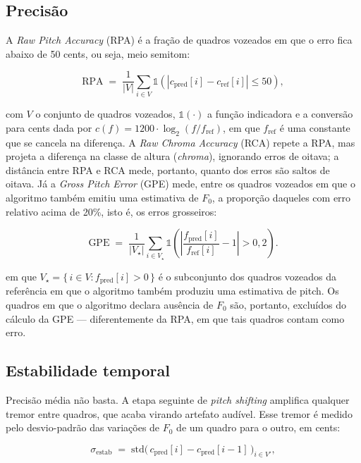 \subsection{Precisão}
A \textit{Raw Pitch Accuracy} (RPA) é a fração de quadros vozeados em que o erro fica abaixo de 50 cents, ou seja, meio semitom:

\begin{equation}
\label{eq:rpa}
\text{RPA} \;=\; \frac{1}{|V|} \sum_{i \in V}
\mathbb{1}\!\left( \left| c_{\text{pred}}[i] - c_{\text{ref}}[i] \right| \leq 50 \right),
\end{equation}

\noindent com $V$ o conjunto de quadros vozeados, $\mathbb{1}(\cdot)$ a função indicadora e a conversão para cents dada por $c(f) = 1200 \cdot \log_{2}(f / f_{\text{ref}})$, em que $f_{\text{ref}}$ é uma constante que se cancela na diferença. A \textit{Raw Chroma Accuracy} (RCA) repete a RPA, mas projeta a diferença na classe de altura (\textit{chroma}), ignorando erros de oitava; a distância entre RPA e RCA mede, portanto, quanto dos erros são saltos de oitava. Já a \textit{Gross Pitch Error} (GPE) mede, entre os quadros vozeados em que o algoritmo também emitiu uma estimativa de $F_0$, a proporção daqueles com erro relativo acima de 20\%, isto é, os erros grosseiros:

\begin{equation}
\label{eq:gpe}
\text{GPE} \;=\; \frac{1}{|V_{\star}|} \sum_{i \in V_{\star}}
\mathbb{1}\!\left(
\left| \frac{f_{\text{pred}}[i]}{f_{\text{ref}}[i]} - 1 \right| > 0{,}2
\right).
\end{equation}

\noindent em que $V_{\star} = \{\, i \in V : f_{\text{pred}}[i] > 0 \,\}$ é o subconjunto dos quadros vozeados da referência em que o algoritmo também produziu uma estimativa de pitch. Os quadros em que o algoritmo declara ausência de $F_0$ são, portanto, excluídos do cálculo da GPE --- diferentemente da RPA, em que tais quadros contam como erro.

\subsection{Estabilidade temporal}
Precisão média não basta. A etapa seguinte de \textit{pitch shifting} amplifica qualquer tremor entre quadros, que acaba virando artefato audível. Esse tremor é medido pelo desvio-padrão das variações de $F_0$ de um quadro para o outro, em cents:

\begin{equation}
\label{eq:estab}
\sigma_{\text{estab}}
\;=\; \mathrm{std}\!\Big(\, c_{\text{pred}}[i] - c_{\text{pred}}[i-1] \,\Big)_{i \in V'},
\end{equation}

